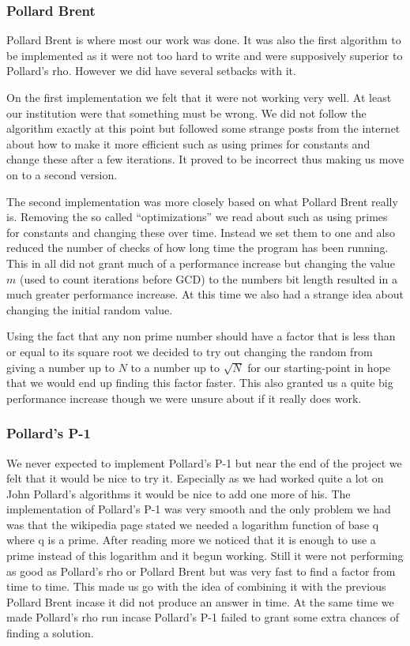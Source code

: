 \subsubsection{Pollard Brent}

Pollard Brent is where most our work was done. It was also the first algorithm to be implemented as it were not too hard to write and were supposively superior to Pollard’s rho. However we did have several setbacks with it.

On the first implementation we felt that it were not working very well. At least our institution were that something must be wrong. We did not follow the algorithm exactly at this point but followed some strange posts from the internet about how to make it more efficient such as using primes for constants and change these after a few iterations. It proved to be incorrect thus making us move on to a second version.

The second implementation was more closely based on what Pollard Brent really is. Removing the so called “optimizations” we read about such as using primes for constants and changing these over time. Instead we set them to one and also reduced the number of checks of how long time the program has been running. This in all did not grant much of a performance increase but changing the value $m$ (used to count iterations before GCD) to the numbers bit length resulted in a much greater performance increase. At this time we also had a strange idea about changing the initial random value.

Using the fact that any non prime number should have a factor that is less than or equal to its square root we decided to try out changing the random from giving a number up to $N$ to a number up to $\sqrt{N}$ for our starting-point in hope that we would end up finding this factor faster. This also granted us a quite big performance increase though we were unsure about if it really does work.

\subsubsection{Pollard’s P-1}

We never expected to implement Pollard’s P-1 but near the end of the project we felt that it would be nice to try it. Especially as we had worked quite a lot on John Pollard’s algorithms it would be nice to add one more of his.
The implementation of Pollard’s P-1 was very smooth and the only problem we had was that the wikipedia page stated we needed a logarithm function of base q where q is a prime. After reading more we noticed that it is enough to use a prime instead of this logarithm and it begun working. Still it were not performing as good as Pollard’s rho or Pollard Brent but was very fast to find a factor from time to time. This made us go with the idea of combining it with the previous Pollard Brent incase it did not produce an answer in time. At the same time we made Pollard’s rho run incase Pollard’s P-1 failed to grant some extra chances of finding a solution.